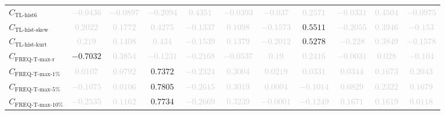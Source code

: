 \documentclass{standalone}
\newcommand{\tlhistsixname}{\text{TL-hist6}}
\newcommand{\tlhistsix}{C_{\tlhistsixname}}
\newcommand{\tlskewhistname}{\text{TL-hist-skew}}
\newcommand{\tlskewhist}{C_{\tlskewhistname}}
\newcommand{\tlkurthistname}{\text{TL-hist-kurt}}
\newcommand{\tlkurthist}{C_{\tlkurthistname}}
\newcommand{\freqmaxrname}{\text{FREQ-T-max-r}}
\newcommand{\freqmaxr}{C_{\freqmaxrname}}
\newcommand{\freqmaxonename}{\text{FREQ-T-max-1\%}}
\newcommand{\freqmaxone}{C_{\freqmaxonename}}
\newcommand{\freqmaxfivename}{\text{FREQ-T-max-5\%}}
\newcommand{\freqmaxfive}{C_{\freqmaxfivename}}
\newcommand{\freqmaxtenname}{\text{FREQ-T-max-10\%}}
\newcommand{\freqmaxten}{C_{\freqmaxtenname}}
\begin{document}
\begin{tabular}{lcccccccccc}
$\tlhistsix$ & \textcolor{lightgray}{$-0.0436$} & \textcolor{lightgray}{$-0.0897$} & \textcolor{lightgray}{$-0.2094$} & \textcolor{lightgray}{$0.4351$} & \textcolor{lightgray}{$-0.0393$} & \textcolor{lightgray}{$-0.037$} & \textcolor{lightgray}{$0.2571$} & \textcolor{lightgray}{$-0.0331$} & \textcolor{lightgray}{$0.4504$} & \textcolor{lightgray}{$-0.0975$} \\ 
$\tlskewhist$ & \textcolor{lightgray}{$0.2022$} & \textcolor{lightgray}{$0.1772$} & \textcolor{lightgray}{$0.4275$} & \textcolor{lightgray}{$-0.1337$} & \textcolor{lightgray}{$0.1098$} & \textcolor{lightgray}{$-0.1573$} & $0.5511$ & \textcolor{lightgray}{$-0.2055$} & \textcolor{lightgray}{$0.3946$} & \textcolor{lightgray}{$-0.153$} \\ 
$\tlkurthist$ & \textcolor{lightgray}{$0.219$} & \textcolor{lightgray}{$0.1408$} & \textcolor{lightgray}{$0.434$} & \textcolor{lightgray}{$-0.1539$} & \textcolor{lightgray}{$0.1379$} & \textcolor{lightgray}{$-0.2012$} & $0.5278$ & \textcolor{lightgray}{$-0.228$} & \textcolor{lightgray}{$0.3849$} & \textcolor{lightgray}{$-0.1578$} \\ 
$\freqmaxr$ & $-0.7032$ & \textcolor{lightgray}{$0.3854$} & \textcolor{lightgray}{$-0.1231$} & \textcolor{lightgray}{$-0.2168$} & \textcolor{lightgray}{$-0.0537$} & \textcolor{lightgray}{$0.19$} & \textcolor{lightgray}{$0.2416$} & \textcolor{lightgray}{$-0.0031$} & \textcolor{lightgray}{$0.028$} & \textcolor{lightgray}{$-0.104$} \\ 
$\freqmaxone$ & \textcolor{lightgray}{$0.0107$} & \textcolor{lightgray}{$0.0792$} & $0.7372$ & \textcolor{lightgray}{$-0.2324$} & \textcolor{lightgray}{$0.3004$} & \textcolor{lightgray}{$0.0219$} & \textcolor{lightgray}{$0.0331$} & \textcolor{lightgray}{$0.0344$} & \textcolor{lightgray}{$0.1673$} & \textcolor{lightgray}{$0.2043$} \\ 
$\freqmaxfive$ & \textcolor{lightgray}{$-0.1075$} & \textcolor{lightgray}{$0.0106$} & $0.7805$ & \textcolor{lightgray}{$-0.2615$} & \textcolor{lightgray}{$0.3019$} & \textcolor{lightgray}{$0.0004$} & \textcolor{lightgray}{$-0.1014$} & \textcolor{lightgray}{$0.0829$} & \textcolor{lightgray}{$0.2322$} & \textcolor{lightgray}{$0.1679$} \\ 
$\freqmaxten$ & \textcolor{lightgray}{$-0.2535$} & \textcolor{lightgray}{$0.1162$} & $0.7734$ & \textcolor{lightgray}{$-0.2669$} & \textcolor{lightgray}{$0.3239$} & \textcolor{lightgray}{$-0.0001$} & \textcolor{lightgray}{$-0.1249$} & \textcolor{lightgray}{$0.1671$} & \textcolor{lightgray}{$0.1619$} & \textcolor{lightgray}{$0.0118$} \\ 

\end{tabular}
\end{document}
